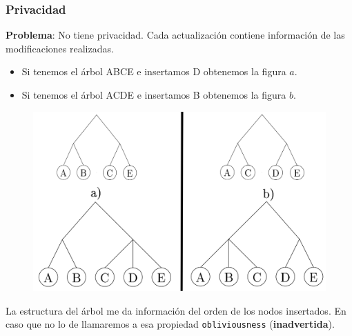 \documentclass[10pt]{beamer}
\begin{document}


\begin{frame}
\frametitle{Privacidad}
\textbf{Problema}: No tiene privacidad. Cada actualización contiene información de las
modificaciones realizadas.
\vspace{-0.2cm}
\begin{itemize}\itemsep-1em
  \item Si tenemos el árbol ABCE e insertamos D obtenemos la figura $a$.
  \item Si tenemos el árbol ACDE e insertamos B obtenemos la figura $b$.
\end{itemize}

\begin{figure}[h!]
    \centering
    \includegraphics[scale=0.20]{2-3tree.jpg}
\end{figure}

\pause
La estructura del árbol me da información del orden de los nodos insertados.
En caso que no lo de llamaremos a esa propiedad \texttt{obliviousness} (\textbf{inadvertida}).

\end{frame}
\end{document}
